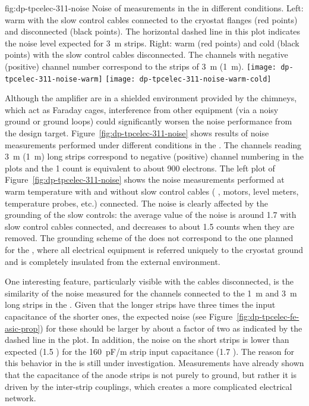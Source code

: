\begin{dunefigure}{fig:dp-tpcelec-311-noise}
{Noise of measurements in the  in different conditions. Left: warm with the slow control cables connected to the cryostat flanges (red points) and disconnected (black points). The horizontal dashed line in this plot indicates the noise level expected for \SI{3}{\meter} strips. Right: warm (red points) and cold (black points) with the slow control cables disconnected. The channels with negative (positive) channel number correspond to the strips of \SI{3}{\meter} (\SI{1}{\meter}).}
\texttt{[image: dp-tpcelec-311-noise-warm]}
\texttt{[image: dp-tpcelec-311-noise-warm-cold]}
\end{dunefigure}

Although the  amplifier  are in a shielded environment provided by the chimneys, which act as Faraday cages, interference from other equipment (via a noisy ground or ground loops) could significantly worsen the noise performance from the design target. Figure~\ref{fig:dp-tpcelec-311-noise} shows results of noise measurements performed under different conditions in the . The channels reading \SI{3}{\meter} (\SI{1}{\metre}) long strips correspond to negative (positive) channel numbering in the plots and the \num{1}  count is equivalent to about \num{900} electrons. The left plot of Figure~\ref{fig:dp-tpcelec-311-noise} shows the noise measurements performed at warm temperature with and without slow control cables ( ,  motors, level meters, temperature probes, etc.) connected. The noise is clearly affected by the grounding of the slow controls: the average value of the noise \rms is around \num{1.7}  with slow control cables connected, and decreases to about \num{1.5}  counts when they are removed. The grounding scheme of the  does not correspond to the one planned for the , where all electrical equipment is referred uniquely to the cryostat ground and is completely insulated from the external environment. 

One interesting feature, particularly visible with the cables disconnected, is the similarity of the noise measured for the channels connected to the \SI{1}{\meter} and \SI{3}{\meter} long strips in the . Given that the longer strips have three times the input capacitance of the shorter ones, the expected noise (see Figure~\ref{fig:dp-tpcelec-fe-asic-prop}) for these should be larger by about a factor of two as indicated by the dashed line in the plot. In addition, the noise on the short strips is lower than expected (\num{1.5} ) for the \SI{160}{pF/m} strip input capacitance (\num{1.7} ). The reason for this behavior in the  is still under investigation. Measurements have already shown that the capacitance of the  anode strips is not purely to ground, but rather it is driven by the inter-strip couplings, which creates a more complicated electrical network. 

